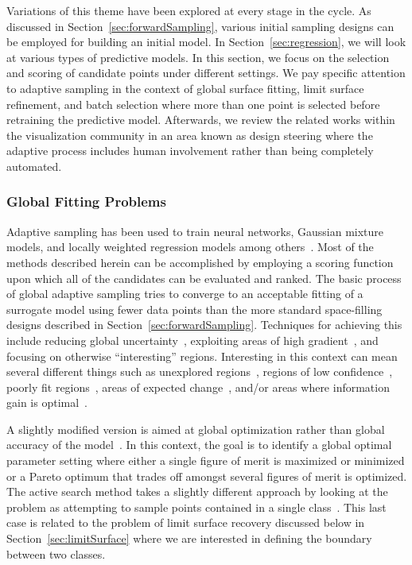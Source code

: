 Variations of this theme have been explored at every stage in the cycle.
%
As discussed in Section~\ref{sec:forwardSampling}, various initial sampling designs can be employed for building an initial model.
%
In Section~\ref{sec:regression}, we will look at various types of predictive models.
%
In this section, we focus on the selection and scoring of candidate points under different settings.
%
We pay specific attention to adaptive sampling in the context of global surface fitting, limit surface refinement, and batch selection where more than one point is selected before retraining the predictive model.
%
Afterwards, we review the related works within the visualization community in an area known as design steering where the adaptive process includes human involvement rather than being completely automated.

\subsubsection{Global Fitting Problems}

Adaptive sampling has been used to train neural networks, Gaussian mixture models, and locally weighted regression models among others~\cite{CohnGhahramaniJordan1996}.
%
Most of the methods described herein can be accomplished by employing a scoring function upon which all of the candidates can be evaluated and ranked.
%
The basic process of global adaptive sampling tries to converge to an acceptable fitting of a surrogate model using fewer data points than the more standard space-filling designs described in Section~\ref{sec:forwardSampling}.
%
Techniques for achieving this include reducing global uncertainty~\cite{CohnGhahramaniJordan1996,TongKoller2001}, exploiting areas of high gradient~\cite{MaljovecWangKupresanin2013}, and focusing on otherwise ``interesting'' regions.
%
Interesting in this context can mean several different things such as unexplored regions~\cite{Whitehead1991}, regions of low confidence~\cite{ThrunMoller1992}, poorly fit regions~\cite{LindenWeber1993}, areas of expected change~\cite{CohnAtlasLadner1990,CohnAtlasLadner1994}, and/or areas where information gain is optimal~\cite{Lam2008}.

A slightly modified version is aimed at global optimization rather than global accuracy of the model~\cite{MooreSchneider1996,JonesSchonlauWelch1998}.
%
In this context, the goal is to identify a global optimal parameter setting where either a single figure of merit is maximized or minimized or a Pareto optimum that trades off amongst several figures of merit is optimized.
%
The active search method takes a slightly different approach by looking at the problem as attempting to sample points contained in a single class~\cite{GarnettKrishnamurthyXiong2012}.
%
This last case is related to the problem of limit surface recovery discussed below in Section~\ref{sec:limitSurface} where we are interested in defining the boundary between two classes.

